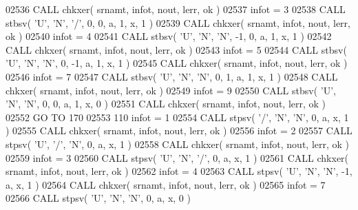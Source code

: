 \begin{DoxyCode}
02536       \textcolor{keyword}{CALL }chkxer( srnamt, infot, nout, lerr, ok )
02537       infot = 3
02538       \textcolor{keyword}{CALL }stbsv( \textcolor{stringliteral}{'U'}, \textcolor{stringliteral}{'N'}, \textcolor{stringliteral}{'/'}, 0, 0, a, 1, x, 1 )
02539       \textcolor{keyword}{CALL }chkxer( srnamt, infot, nout, lerr, ok )
02540       infot = 4
02541       \textcolor{keyword}{CALL }stbsv( \textcolor{stringliteral}{'U'}, \textcolor{stringliteral}{'N'}, \textcolor{stringliteral}{'N'}, -1, 0, a, 1, x, 1 )
02542       \textcolor{keyword}{CALL }chkxer( srnamt, infot, nout, lerr, ok )
02543       infot = 5
02544       \textcolor{keyword}{CALL }stbsv( \textcolor{stringliteral}{'U'}, \textcolor{stringliteral}{'N'}, \textcolor{stringliteral}{'N'}, 0, -1, a, 1, x, 1 )
02545       \textcolor{keyword}{CALL }chkxer( srnamt, infot, nout, lerr, ok )
02546       infot = 7
02547       \textcolor{keyword}{CALL }stbsv( \textcolor{stringliteral}{'U'}, \textcolor{stringliteral}{'N'}, \textcolor{stringliteral}{'N'}, 0, 1, a, 1, x, 1 )
02548       \textcolor{keyword}{CALL }chkxer( srnamt, infot, nout, lerr, ok )
02549       infot = 9
02550       \textcolor{keyword}{CALL }stbsv( \textcolor{stringliteral}{'U'}, \textcolor{stringliteral}{'N'}, \textcolor{stringliteral}{'N'}, 0, 0, a, 1, x, 0 )
02551       \textcolor{keyword}{CALL }chkxer( srnamt, infot, nout, lerr, ok )
02552       \textcolor{keywordflow}{GO TO} 170
02553   110 infot = 1
02554       \textcolor{keyword}{CALL }stpsv( \textcolor{stringliteral}{'/'}, \textcolor{stringliteral}{'N'}, \textcolor{stringliteral}{'N'}, 0, a, x, 1 )
02555       \textcolor{keyword}{CALL }chkxer( srnamt, infot, nout, lerr, ok )
02556       infot = 2
02557       \textcolor{keyword}{CALL }stpsv( \textcolor{stringliteral}{'U'}, \textcolor{stringliteral}{'/'}, \textcolor{stringliteral}{'N'}, 0, a, x, 1 )
02558       \textcolor{keyword}{CALL }chkxer( srnamt, infot, nout, lerr, ok )
02559       infot = 3
02560       \textcolor{keyword}{CALL }stpsv( \textcolor{stringliteral}{'U'}, \textcolor{stringliteral}{'N'}, \textcolor{stringliteral}{'/'}, 0, a, x, 1 )
02561       \textcolor{keyword}{CALL }chkxer( srnamt, infot, nout, lerr, ok )
02562       infot = 4
02563       \textcolor{keyword}{CALL }stpsv( \textcolor{stringliteral}{'U'}, \textcolor{stringliteral}{'N'}, \textcolor{stringliteral}{'N'}, -1, a, x, 1 )
02564       \textcolor{keyword}{CALL }chkxer( srnamt, infot, nout, lerr, ok )
02565       infot = 7
02566       \textcolor{keyword}{CALL }stpsv( \textcolor{stringliteral}{'U'}, \textcolor{stringliteral}{'N'}, \textcolor{stringliteral}{'N'}, 0, a, x, 0 )

\end{DoxyCode}
